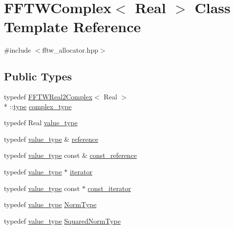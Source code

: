 \hypertarget{class_f_f_t_w_complex}{\section{F\-F\-T\-W\-Complex$<$ Real $>$ Class Template Reference}
\label{class_f_f_t_w_complex}
}


{\ttfamily \#include $<$fftw\-\_\-allocator.\-hpp$>$}

\subsection*{Public Types}
\begin{DoxyCompactItemize}
\item 
typedef \hyperlink{struct_f_f_t_w_real2_complex}{F\-F\-T\-W\-Real2\-Complex}$<$ Real $>$\\*
\-::\hyperlink{convert2cfg_8m_a2902a7a983ab04c79cae2162ad553481}{type} \hyperlink{class_f_f_t_w_complex_ad0e87dc783429ac362b464f0c561357b}{complex\-\_\-type}
\item 
typedef Real \hyperlink{class_f_f_t_w_complex_af159fb8086896f4f62494d72ce0f9d38}{value\-\_\-type}
\item 
typedef \hyperlink{class_f_f_t_w_complex_af159fb8086896f4f62494d72ce0f9d38}{value\-\_\-type} \& \hyperlink{class_f_f_t_w_complex_a7dfe1fb0319193094de12aef4000957d}{reference}
\item 
typedef \hyperlink{class_f_f_t_w_complex_af159fb8086896f4f62494d72ce0f9d38}{value\-\_\-type} const \& \hyperlink{class_f_f_t_w_complex_abf193fae52159474a60f7377e5c363e5}{const\-\_\-reference}
\item 
typedef \hyperlink{class_f_f_t_w_complex_af159fb8086896f4f62494d72ce0f9d38}{value\-\_\-type} $\ast$ \hyperlink{class_f_f_t_w_complex_acd25e1e4222dcf20dd6dcdbd38bdb190}{iterator}
\item 
typedef \hyperlink{class_f_f_t_w_complex_af159fb8086896f4f62494d72ce0f9d38}{value\-\_\-type} const $\ast$ \hyperlink{class_f_f_t_w_complex_ade8293628a3a66859ee87cd4cb783308}{const\-\_\-iterator}
\item 
typedef \hyperlink{class_f_f_t_w_complex_af159fb8086896f4f62494d72ce0f9d38}{value\-\_\-type} \hyperlink{class_f_f_t_w_complex_a32b15a773ea0128be7cecdc7fc49df11}{Norm\-Type}
\item 
typedef \hyperlink{class_f_f_t_w_complex_af159fb8086896f4f62494d72ce0f9d38}{value\-\_\-type} \hyperlink{class_f_f_t_w_complex_a048e30a91c9d932442272164d8a8db40}{Squared\-Norm\-Type}
\end{DoxyCompactItemize}
